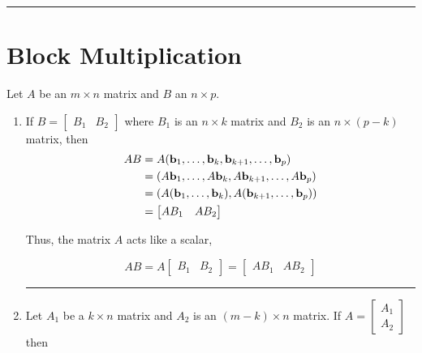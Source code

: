   

\rule[0.01in]{\textwidth}{0.0025in}


 

 

\section*{Block Multiplication}
Let $A$ be an $m \times n$ matrix and $B$ an $n \times p$. 

\begin{enumerate}
	\item If $B = \begin{bmatrix} B_1 &	B_2 \end{bmatrix}$ where $B_1$ is an $n \times k$ matrix and $B_2$ is an $n \times (p-k)$ matrix, then
	\begin{align*}
	 AB 	&= A ({\bf b}_1, \dots, {\bf b}_k, {\bf b}_{k+1}, \dots, {\bf b}_p) \\
	 	&= (A{\bf b}_1, \dots, A{\bf b}_k, A{\bf b}_{k+1}, \dots, A{\bf b}_p)\\
		&= (A({\bf b}_1, \dots, {\bf b}_k), A({\bf b}_{k+1}, \dots, {\bf b}_p))\\
		&= \begin{bmatrix} AB_1	& 	AB_2 \end{bmatrix}
	\end{align*}
	
	Thus, the matrix $A$ acts like a scalar,
	
	\begin{tcolorbox}[colback=yellow!10!,colframe=gray!15!]
	\[
	AB = A \begin{bmatrix} B_1	& 	B_2 \end{bmatrix} =  \begin{bmatrix} AB_1	& 	AB_2 \end{bmatrix} 
	\]
	\end{tcolorbox}
	
	
\rule[0.01in]{\textwidth}{0.0025in}

	
	\item Let $A_1$ be a $k \times n$ matrix and $A_2$ is an $(m - k) \times n$ matrix.  If $A = \begin{bmatrix} A_1 \\ A_2 \end{bmatrix}$
	then 
	

\end{enumerate}
